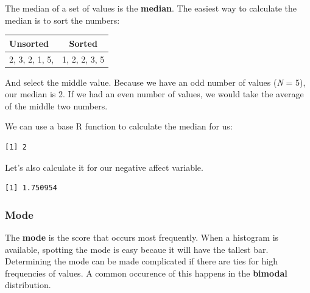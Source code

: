 \documentclass[
  11pt,
]{book}
\newenvironment{Shaded}{\begin{snugshade}}{\end{snugshade}}
\newcommand{\AttributeTok}[1]{\textcolor[rgb]{0.77,0.63,0.00}{#1}}
\newcommand{\ConstantTok}[1]{\textcolor[rgb]{0.00,0.00,0.00}{#1}}
\newcommand{\FunctionTok}[1]{\textcolor[rgb]{0.00,0.00,0.00}{#1}}
\newcommand{\NormalTok}[1]{#1}
\newcommand{\SpecialCharTok}[1]{\textcolor[rgb]{0.00,0.00,0.00}{#1}}
\begin{document}
The median of a set of values is the \textbf{median}. The easiest way to calculate the median is to sort the numbers:

\begin{longtable}[]{@{}lc@{}}
\toprule()
Unsorted & Sorted \\
\midrule()
\endhead
2, 3, 2, 1, 5, & 1, 2, 2, 3, 5 \\
\bottomrule()
\end{longtable}

And select the middle value. Because we have an odd number of values (\emph{N} = 5), our median is 2. If we had an even number of values, we would take the average of the middle two numbers.

We can use a base R function to calculate the median for us:

\begin{Shaded}
\end{Shaded}

\begin{verbatim}
[1] 2
\end{verbatim}

Let's also calculate it for our negative affect variable.

\begin{Shaded}
\end{Shaded}

\begin{verbatim}
[1] 1.750954
\end{verbatim}

\hypertarget{mode}{%
\subsubsection{Mode}\label{mode}}

The \textbf{mode} is the score that occurs most frequently. When a histogram is available, spotting the mode is easy becaue it will have the tallest bar. Determining the mode can be made complicated if there are ties for high frequencies of values. A common occurence of this happens in the \textbf{bimodal} distribution.
\end{document}
